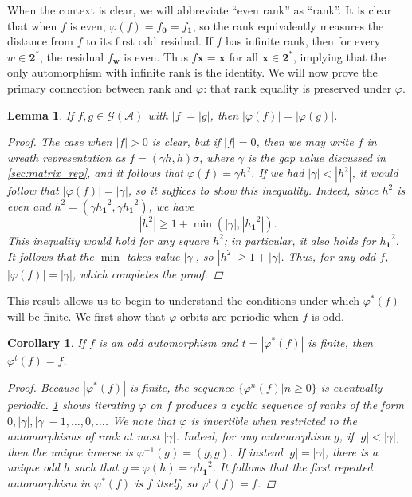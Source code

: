 \documentclass[12pt, letterpaper]{article}
\newcommand{\bin}{\mathbf 2}
\newcommand{\A}{\mathcal A}
\newcommand{\ch}[1]{\mathbf{#1}}
\newcommand{\res}[2]{{{#1}_{\ch{#2}}}}
\newcommand{\gp}{\mathcal G}
\newcommand{\rk}[1]{\left|#1\right|}
\newtheorem{lemma}[thm]{Lemma}
\newtheorem{cor}[thm]{Corollary}
\begin{document}
When the context is clear, we will abbreviate ``even rank'' as ``rank''.  It is
clear that when $f$ is even, $\varphi(f) = \res{f}{0} = \res{f}{1}$, so the
rank equivalently measures the distance from $f$ to its first odd residual. If
$f$ has infinite rank, then for every $w \in \bin^*$, the residual $\res{f}{w}$
is even. Thus $f \ch{x} = \ch{x}$ for all $\ch{x} \in \bin^*$, implying that
the only automorphism with infinite rank is the identity. We will now prove the
primary connection between rank and $\varphi$: that rank equality is preserved
under $\varphi$.
\begin{lemma}\label{lemma:rank_varphi}
    If $f, g \in \gp(\A)$ with $\rk{f} = \rk{g}$, then
    $\rk{\varphi(f)} = \rk{\varphi(g)}$.
    \begin{proof}
        The case when $\rk{f} > 0$ is clear, but if $\rk{f} = 0$, then we may
        write $f$ in wreath representation as $f = (\gamma h, h) \sigma$, where
        $\gamma$ is the gap value discussed in \cref{sec:matrix_rep}, and it
        follows that $\varphi(f) = \gamma h^2$.  If we had $\rk{\gamma} <
        \rk{h^2}$, it would follow that $\rk{\varphi(f)} = \rk{\gamma}$, so it
        suffices to show this inequality. Indeed, since $h^2$ is even and $h^2
        = (\gamma \res{h}{1}^2, \gamma \res{h}{1}^2)$, we have
        \[
            \rk{h^2} \ge 1 + \min(\rk{\gamma}, \rk{\res{h}{1}^2}).
        \]
        This inequality would hold for any square $h^2$; in particular, it also
        holds for $\res{h}{1}^2$. It follows that the $\min$ takes value
        $\rk{\gamma}$, so $\rk{h^2} \ge 1 + \rk{\gamma}$. Thus, for any odd
        $f$, $\rk{\varphi(f)} = \rk{\gamma}$, which completes the proof.
    \end{proof}
\end{lemma}

This result allows us to begin to understand the conditions under which
$\varphi^*(f)$ will be finite. We first show that $\varphi$-orbits are periodic
when $f$ is odd.

\begin{cor}\label{cor:odd_finite_repeat}
    If $f$ is an odd automorphism and $t = |\varphi^*(f)|$ is finite, then
    $\varphi^t (f) = f$.
    \begin{proof}
        Because $|\varphi^*(f)|$ is finite, the sequence $\{\varphi^n(f) | n
        \ge 0\}$ is eventually periodic. \cref{lemma:rank_varphi} shows
        iterating $\varphi$ on $f$ produces a cyclic sequence of ranks of the
        form $0, \rk{\gamma}, \rk{\gamma} - 1, \ldots, 0, \ldots$.  We note
        that $\varphi$ is invertible when restricted to the automorphisms of
        rank at most $\rk{\gamma}$. Indeed, for any automorphism $g$, if
        $\rk{g} < \rk{\gamma}$, then the unique inverse is $\varphi^{-1}(g) =
        (g, g)$. If instead $\rk{g} = \rk{\gamma}$, there is a unique odd $h$
        such that $g = \varphi(h) = \gamma \res{h}{1}^2$.  It follows that the
        first repeated automorphism in $\varphi^*(f)$ is $f$ itself, so
        $\varphi^t(f) = f$.
    \end{proof}
\end{cor}
\end{document}

